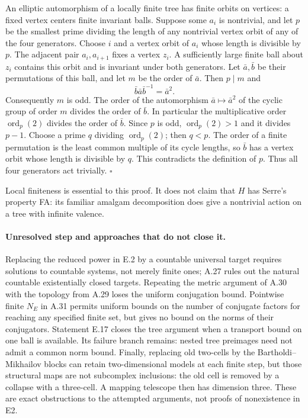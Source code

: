 An elliptic automorphism of a locally finite tree has finite orbits
on vertices: a fixed vertex centers finite invariant balls. Suppose
some $a_i$ is nontrivial, and let $p$ be the smallest prime dividing
the length of any nontrivial vertex orbit of any of the four generators.
Choose $i$ and a vertex orbit of $a_i$ whose length is divisible by $p$.
The adjacent pair $a_i,a_{i+1}$ fixes a vertex $z_i$. A sufficiently
large finite ball about $z_i$ contains this orbit and is invariant under
both generators. Let $\bar a,\bar b$ be their permutations of this ball,
and let $m$ be the order of $\bar a$. Then $p\mid m$ and
\[
 \bar b\bar a\bar b^{-1}=\bar a^2.
\]
Consequently $m$ is odd. The order of the automorphism
$\bar a\mapsto\bar a^2$ of the cyclic group of order $m$ divides
the order of $\bar b$. In particular the multiplicative order
$\operatorname{ord}_p(2)$ divides the order of $\bar b$.
Since $p$ is odd, $\operatorname{ord}_p(2)>1$ and it divides $p-1$.
Choose a prime $q$ dividing $\operatorname{ord}_p(2)$; then $q<p$.
The order of a finite permutation is the least common multiple of
its cycle lengths, so $\bar b$ has a vertex orbit whose length is
divisible by $q$. This contradicts the definition of $p$.
Thus all four generators act trivially.
\hfill$\square$

Local finiteness is essential to this proof. It does not claim that
$H$ has Serre's property FA: its familiar amalgam decomposition does
give a nontrivial action on a tree with infinite valence.


\paragraph{Unresolved step and approaches that do not close it.}
Replacing the reduced power in E.2 by a countable
universal target requires solutions to countable
systems, not merely finite ones; A.27 rules out
the natural countable existentially closed
targets. Repeating the metric argument of
A.30 with the topology from A.29 loses the
uniform conjugation bound. Pointwise finite
$N_E$ in A.31 permits uniform bounds on the number of
conjugate factors for reaching any specified finite set,
but gives no bound on the norms of their conjugators.
Statement E.17 closes the tree argument when a transport
bound on one ball is available. Its failure branch remains:
nested tree preimages need not admit a common norm bound.
Finally, replacing old two-cells by the
Bartholdi--Mikhailov blocks can retain
two-dimensional models at each finite step,
but those structural maps are not subcomplex
inclusions: the old cell is removed by a
collapse with a three-cell. A mapping telescope
then has dimension three. These are exact
obstructions to the attempted arguments,
not proofs of nonexistence in E2.
